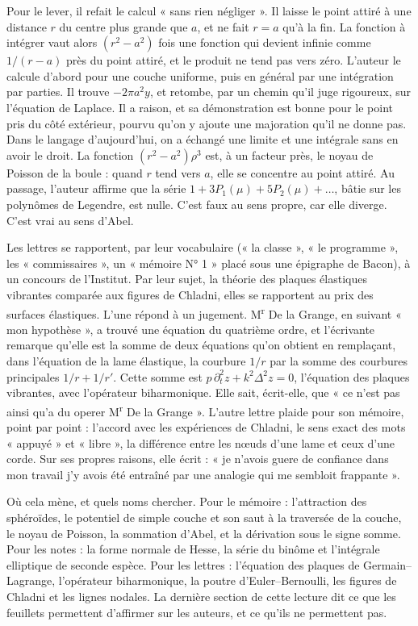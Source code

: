 \documentclass[11pt,a4paper]{article}
\begin{document}
\begin{resume}
Pour le lever, il refait le calcul « sans rien négliger ». Il laisse le point
attiré à une distance \(r\) du centre plus grande que \(a\), et ne fait \(r=a\)
qu'à la fin. La fonction à intégrer vaut alors \((r^2-a^2)\) fois une fonction
qui devient infinie comme \(1/(r-a)\) près du point attiré, et le produit ne
tend pas vers zéro. L'auteur le calcule d'abord pour une couche uniforme, puis
en général par une intégration par parties. Il trouve \(-2\pi a^2 y\), et
retombe, par un chemin qu'il juge rigoureux, sur l'équation de Laplace. Il a
raison, et sa démonstration est bonne pour le point pris du côté extérieur,
pourvu qu'on y ajoute une majoration qu'il ne donne pas. Dans le langage
d'aujourd'hui, on a échangé une limite et une intégrale sans en avoir le droit.
La fonction \((r^2-a^2)\rho^3\) est, à un facteur près, le noyau de Poisson de
la boule : quand \(r\) tend vers \(a\), elle se concentre au point attiré. Au
passage, l'auteur affirme que la série \(1+3P_1(\mu)+5P_2(\mu)+\dots\), bâtie sur
les polynômes de Legendre, est nulle. C'est faux au sens propre, car elle
diverge. C'est vrai au sens d'Abel.

Les lettres se rapportent, par leur vocabulaire (« la classe », « le
programme », les « commissaires », un « mémoire N° 1 » placé sous une
épigraphe de Bacon), à un concours de l'Institut. Par leur sujet, la théorie
des plaques élastiques vibrantes comparée aux figures de Chladni, elles se
rapportent au prix des surfaces élastiques. L'une répond à un jugement.
M\textsuperscript{r} De la Grange, en suivant « mon hypothèse », a trouvé une
équation du quatrième ordre, et l'écrivante remarque qu'elle est la somme de
deux équations qu'on obtient en remplaçant, dans l'équation de la lame
élastique, la courbure \(1/r\) par la somme des courbures principales
\(1/r+1/r'\). Cette somme est \(p\,\partial_t^2 z + k^2\Delta^2 z = 0\),
l'équation des plaques vibrantes, avec l'opérateur biharmonique. Elle sait,
écrit-elle, que « ce n'est pas ainsi qu'a du operer M\textsuperscript{r} De la
Grange ». L'autre lettre plaide pour son mémoire, point par point : l'accord
avec les expériences de Chladni, le sens exact des mots « appuyé » et
« libre », la différence entre les nœuds d'une lame et ceux d'une corde. Sur
ses propres raisons, elle écrit : « je n'avois guere de confiance dans mon
travail j'y avois été entraîné par une analogie qui me sembloit frappante ».

Où cela mène, et quels noms chercher. Pour le mémoire : l'attraction des
sphéroïdes, le potentiel de simple couche et son saut à la traversée de la
couche, le noyau de Poisson, la sommation d'Abel, et la dérivation sous le
signe somme. Pour les notes : la forme normale de Hesse, la série du binôme et
l'intégrale elliptique de seconde espèce. Pour les lettres : l'équation des
plaques de Germain–Lagrange, l'opérateur biharmonique, la poutre
d'Euler–Bernoulli, les figures de Chladni et les lignes nodales. La dernière
section de cette lecture dit ce que les feuillets permettent d'affirmer sur les
auteurs, et ce qu'ils ne permettent pas.


\end{resume}
\end{document}
